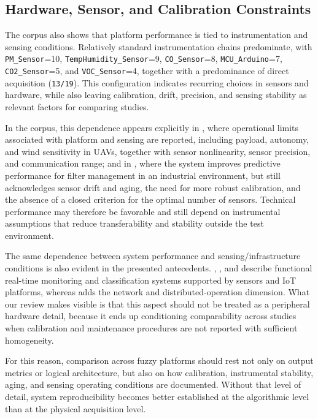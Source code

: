 \subsection{Hardware, Sensor, and Calibration Constraints}
The corpus also shows that platform performance is tied to instrumentation and sensing conditions. Relatively standard instrumentation chains predominate, with \texttt{PM\_Sensor}=10, \texttt{TempHumidity\_Sensor}=9, \texttt{CO\_Sensor}=8, \texttt{MCU\_Arduino}=7, \texttt{CO2\_Sensor}=5, and \texttt{VOC\_Sensor}=4, together with a predominance of direct acquisition (\texttt{13/19}). This configuration indicates recurring choices in sensors and hardware, while also leaving calibration, drift, precision, and sensing stability as relevant factors for comparing studies.

In the corpus, this dependence appears explicitly in \cite{A001}, where operational limits associated with platform and sensing are reported, including payload, autonomy, and wind sensitivity in UAVs, together with sensor nonlinearity, sensor precision, and communication range; and in \cite{A087}, where the system improves predictive performance for filter management in an industrial environment, but still acknowledges sensor drift and aging, the need for more robust calibration, and the absence of a closed criterion for the optimal number of sensors. Technical performance may therefore be favorable and still depend on instrumental assumptions that reduce transferability and stability outside the test environment.

The same dependence between system performance and sensing/infrastructure conditions is also evident in the presented antecedents. \cite{ART05}, \cite{ART06}, and \cite{ART07} describe functional real-time monitoring and classification systems supported by sensors and IoT platforms, whereas \cite{ART08} adds the network and distributed-operation dimension. What our review makes visible is that this aspect should not be treated as a peripheral hardware detail, because it ends up conditioning comparability across studies when calibration and maintenance procedures are not reported with sufficient homogeneity.

For this reason, comparison across fuzzy platforms should rest not only on output metrics or logical architecture, but also on how calibration, instrumental stability, aging, and sensing operating conditions are documented. Without that level of detail, system reproducibility becomes better established at the algorithmic level than at the physical acquisition level.

